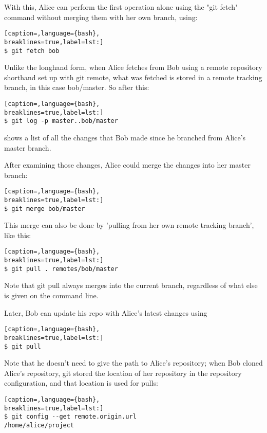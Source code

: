 With this, Alice can perform the first operation alone using the "git fetch"
command without merging them with her own branch, using:
\lstset{basicstyle=\scriptsize, numbers=none, captionpos=b, tabsize=4}
\begin{lstlisting}[caption=,language={bash},
breaklines=true,label=lst:]
$ git fetch bob
\end{lstlisting}

Unlike the longhand form, when Alice fetches from Bob using a remote repository
shorthand set up with git remote, what was fetched is stored in a remote
tracking branch, in this case bob/master. So after this:
\lstset{basicstyle=\scriptsize, numbers=none, captionpos=b, tabsize=4}
\begin{lstlisting}[caption=,language={bash},
breaklines=true,label=lst:]
$ git log -p master..bob/master
\end{lstlisting}

shows a list of all the changes that Bob made since he branched from Alice's
master branch.

After examining those changes, Alice could merge the changes into her master
branch:
\lstset{basicstyle=\scriptsize, numbers=none, captionpos=b, tabsize=4}
\begin{lstlisting}[caption=,language={bash},
breaklines=true,label=lst:]
$ git merge bob/master
\end{lstlisting}

This merge can also be done by 'pulling from her own remote tracking branch',
like this:
\lstset{basicstyle=\scriptsize, numbers=none, captionpos=b, tabsize=4}
\begin{lstlisting}[caption=,language={bash},
breaklines=true,label=lst:]
$ git pull . remotes/bob/master
\end{lstlisting}

Note that git pull always merges into the current branch, regardless of what
else is given on the command line.

Later, Bob can update his repo with Alice's latest changes using
\lstset{basicstyle=\scriptsize, numbers=none, captionpos=b, tabsize=4}
\begin{lstlisting}[caption=,language={bash},
breaklines=true,label=lst:]
$ git pull
\end{lstlisting}

Note that he doesn't need to give the path to Alice's repository; when Bob
cloned Alice's repository, git stored the location of her repository in the
repository configuration, and that location is used for pulls:
\lstset{basicstyle=\scriptsize, numbers=none, captionpos=b, tabsize=4}
\begin{lstlisting}[caption=,language={bash},
breaklines=true,label=lst:]
$ git config --get remote.origin.url
/home/alice/project
\end{lstlisting}


